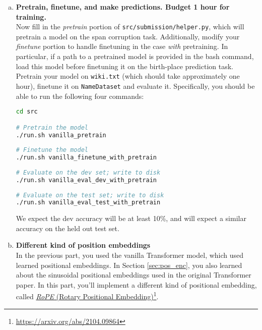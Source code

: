 \begin{enumerate}[(a)]
\item {} \textbf{Pretrain, finetune, and make predictions. Budget 1 hour for training.}\\
Now fill in the \textit{pretrain} portion of \texttt{src/submission/helper.py}, which will pretrain a model on the span corruption task. Additionally, modify your \textit{finetune} portion to handle finetuning in the case \textit{with} pretraining. In particular, if a path to a pretrained model is provided in the bash command, load this model before finetuning it on the birth-place prediction task.
Pretrain your model on \texttt{wiki.txt} (which should take approximately one hour), finetune it on \texttt{NameDataset} and evaluate it. Specifically, you should be able to run the following four commands:

\begin{lstlisting}[language=bash]
cd src

# Pretrain the model
./run.sh vanilla_pretrain
        
# Finetune the model
./run.sh vanilla_finetune_with_pretrain
        
# Evaluate on the dev set; write to disk
./run.sh vanilla_eval_dev_with_pretrain
        
# Evaluate on the test set; write to disk
./run.sh vanilla_eval_test_with_pretrain
\end{lstlisting}

We expect the dev accuracy will be at least 10\%, and will expect a similar accuracy on the held out test set.

\pagebreak %

\item {} \textbf{Different kind of position embeddings}\\

In the previous part, you used the vanilla Transformer model, which used learned positional embeddings. In Section \ref{sec:pos_enc}, you also learned about the sinusoidal positional embeddings used in the original Transformer paper. In this part, you'll implement a different kind of positional embedding, called \href{https://arxiv.org/abs/2104.09864}{\textit{RoPE} (Rotary Positional Embedding)}\footnote{\url{https://arxiv.org/abs/2104.09864}}.


\end{enumerate}
